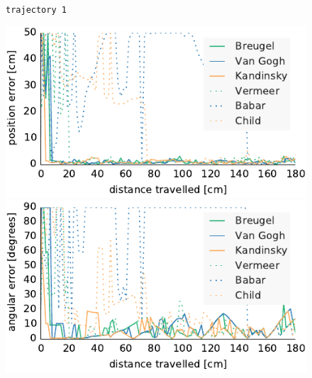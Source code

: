 \documentclass[letterpaper, 10pt, conference]{ieeeconf}
\begin{document}
\begin{figure}
\begin{center}
\texttt{trajectory~1}
\end{center}
\includegraphics{ml-grayscale_images-random_1-xy}\hfill
\includegraphics{ml-grayscale_images-random_1-theta}

\vspace{.5em}


\end{figure}
\end{document}
